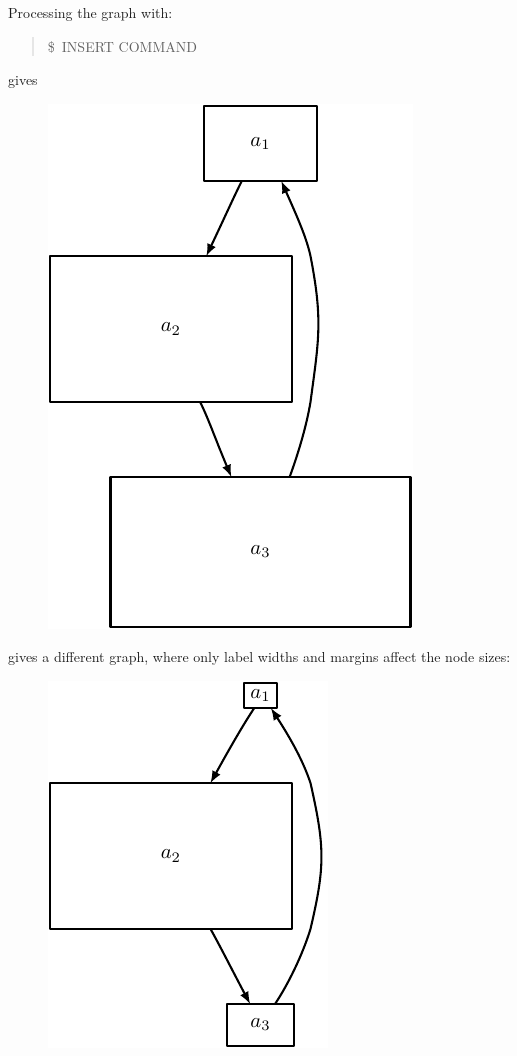 \documentclass[10pt,a4paper,english]{article}
\begin{document}
Processing the graph with:
\begin{quote}{\ttfamily \raggedright \noindent
{\$}~INSERT COMMAND
}\end{quote}

gives
\begin{figure}[H]
\centering

\includegraphics{pdf/nodewidth1}
\end{figure}


gives a different graph, where only label widths and margins affect the node sizes:
\begin{figure}[H]
\centering

\includegraphics{pdf/nodewidth2}
\end{figure}
\end{document}
